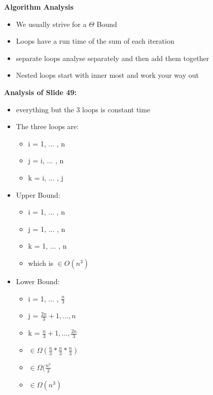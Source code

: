 \documentclass[12pt,a4paper]{report}
\begin{document}
	\textbf{Algorithm Analysis}
	\begin{itemize}
	\item We usually strive for a $\Theta$ Bound
	\item Loops have a run time of the sum of each iteration
	\item separate loops analyse separately and then add them together
	\item Nested loops start with inner most and work your way out
	
	\end{itemize}
	\textbf{Analysis of Slide 49:}
	\begin{itemize}
	\item everything but the 3 loops is constant time
	\item The three loops are:
	\begin{itemize}
	\item i = 1, ... , n
	\item j = i, ... , n
	\item k = i, ... , j
	\end{itemize}
	\item Upper Bound:
	\begin{itemize}
	\item i = 1, ... , n
	\item j = 1, ... , n
	\item k = 1, ... , n
	\item which is $\in O(n^3)$
	\end{itemize}
	\item Lower Bound:
	\begin{itemize}
	\item i = 1, ... , $\frac{n}{3}$
	\item j = $\frac{2n}{3} + 1, ... , n$
	\item k = $\frac{n}{3} + 1, ... , \frac{2n}{3}$
	\item $\in \Omega(\frac{n}{3}*\frac{n}{3}*\frac{n}{3})$
	\item $\in \Omega(\frac{n^3}{3}$
	\item $\in \Omega(n^3)$
	\end{itemize}
	\end{itemize}
\end{document}
